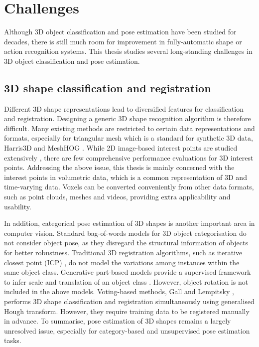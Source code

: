 \section{Challenges}

Although 3D object classification and pose estimation have been studied for decades, there is still much room for improvement in fully-automatic shape or action recognition systems. 
This thesis studies several long-standing challenges in 3D object classification and pose estimation.  

\subsection{3D shape classification and registration} 

Different 3D shape representations lead to diversified features for classification and registration. Designing a generic 3D shape recognition algorithm is therefore difficult. Many existing methods are restricted to certain data representations and formats, especially for triangular mesh which is a standard for synthetic 3D data, \eg Harris3D \cite{Sipiran2011} and MeshHOG \cite{Zaharescu2009}.     
While 2D image-based interest points are studied extensively \cite{Mikolajczyk2005}, there are few comprehensive performance evaluations for 3D interest points. 
Addressing the above issue, this thesis is mainly concerned with the interest points in volumetric data, which is a common representation of 3D and time-varying data. Voxels can be converted conveniently from other data formats, such as point clouds, meshes and videos, providing extra applicability and usability. 

In addition, categorical pose estimation of 3D shapes is another important area in computer vision.
Standard bag-of-words models for 3D object categorisation do not consider object pose, as they disregard the structural information of objects for better robustness. Traditional 3D registration algorithms, such as iterative closest point (ICP) \cite{Besl1992}, do not model the variations among instances within the same object class. 
Generative part-based models provide a supervised framework to infer scale and translation of an object class \cite{Weber2000, Fergus2007}. However, object rotation is not included in the above models. 
Voting-based methods, \eg Gall and Lempitsky \cite{Gall2009a}, performs 3D shape classification and registration simultaneously using generalised Hough transform. However, they require training data to be registered manually in advance.  
To summarise, pose estimation of 3D shapes remains a largely unresolved issue, especially for category-based and unsupervised pose estimation tasks.  

